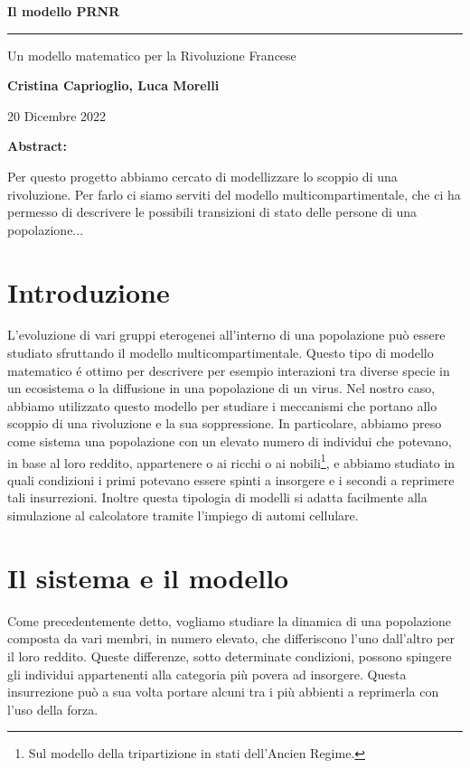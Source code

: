 \begin{center}
	\huge \textbf{Il modello PRNR}
	
	\rule{7cm}{0.4pt} 
	
	\LARGE Un modello matematico per la Rivoluzione Francese
	
	\vspace{20pt}
	
	\LARGE \textbf{Cristina Caprioglio, Luca Morelli}
	
	\vspace{5pt}
	
	\LARGE 20 Dicembre 2022
	
	\vspace{20pt}
 
	\normalsize\textbf{Abstract:}\\
\end{center}
Per questo progetto abbiamo cercato di modellizzare lo scoppio di una rivoluzione. Per farlo ci siamo serviti del modello multicompartimentale, che ci ha permesso di descrivere le possibili transizioni di stato delle persone di una popolazione...

\vspace{20pt}

\section*{Introduzione}
L'evoluzione di vari gruppi eterogenei all'interno di una popolazione può essere studiato sfruttando il modello multicompartimentale. Questo tipo di modello matematico é ottimo per descrivere per esempio interazioni tra diverse specie in un ecosistema o la diffusione in una popolazione di un virus. Nel nostro caso, abbiamo utilizzato questo modello per studiare i meccanismi che portano allo scoppio di una rivoluzione e la sua soppressione. In particolare, abbiamo preso come sistema una popolazione con un elevato numero di individui che potevano, in base al loro reddito, appartenere o ai ricchi o ai nobili\footnote{Sul modello della tripartizione in stati dell'Ancien Regime.}, e abbiamo studiato in quali condizioni i primi potevano essere spinti a insorgere e i secondi a reprimere tali insurrezioni. Inoltre questa tipologia di modelli si adatta facilmente alla simulazione al calcolatore tramite l'impiego di automi cellulare.
\section{Il sistema e il modello} \label{sistema modello}
Come precedentemente detto, vogliamo studiare la dinamica di una popolazione composta da vari membri, in numero elevato, che differiscono l'uno dall'altro per il loro reddito. Queste differenze, sotto determinate condizioni, possono spingere gli individui appartenenti alla categoria più povera ad insorgere. Questa insurrezione può a sua volta portare alcuni tra i più abbienti a reprimerla con l'uso della forza.\\

